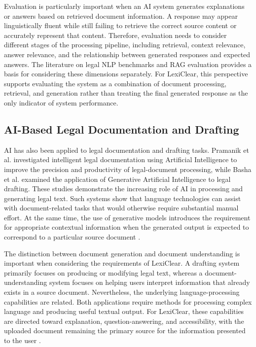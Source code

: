 \documentclass[12pt,a4paper,oneside]{report}
\begin{document}
Evaluation is particularly important when an AI system generates explanations
or answers based on retrieved document information. A response may appear
linguistically fluent while still failing to retrieve the correct source
content or accurately represent that content. Therefore, evaluation needs to
consider different stages of the processing pipeline, including retrieval,
context relevance, answer relevance, and the relationship between generated
responses and expected answers. The literature on legal NLP benchmarks and
RAG evaluation provides a basis for considering these dimensions separately.
For LexiClear, this perspective supports evaluating the system as a
combination of document processing, retrieval, and generation rather than
treating the final generated response as the only indicator of system
performance\cite{es2024ragas,zhang2020bertscore}.

\subsection{AI-Based Legal Documentation and Drafting}

AI has also been applied to legal documentation and drafting tasks. Pramanik
et al. investigated intelligent legal documentation using Artificial
Intelligence to improve the precision and productivity of legal-document
processing, while Basha et al. examined the application of Generative
Artificial Intelligence to legal drafting. These studies demonstrate the
increasing role of AI in processing and generating legal text. Such systems
show that language technologies can assist with document-related tasks that
would otherwise require substantial manual effort. At the same time, the use
of generative models introduces the requirement for appropriate contextual
information when the generated output is expected to correspond to a
particular source document
\cite{pramanik2025,basha2024}.

The distinction between document generation and document understanding is
important when considering the requirements of LexiClear. A drafting system
primarily focuses on producing or modifying legal text, whereas a
document-understanding system focuses on helping users interpret information
that already exists in a source document. Nevertheless, the underlying
language-processing capabilities are related. Both applications require
methods for processing complex language and producing useful textual output.
For LexiClear, these capabilities are directed toward explanation,
question-answering, and accessibility, with the uploaded document remaining
the primary source for the information presented to the user
\cite{pramanik2025,basha2024}.
\end{document}
